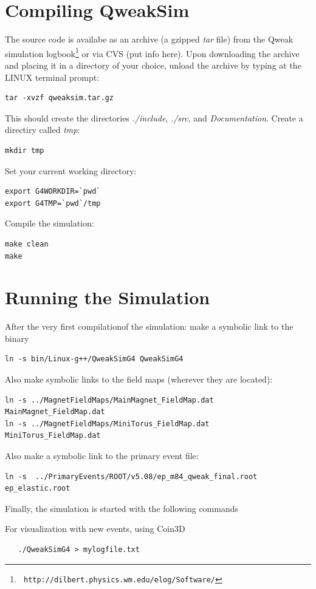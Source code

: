 \section{Compiling QweakSim}

The source code is availabe as an archive (a gzipped {\em tar} file)
from the Qweak simulation logbook\footnote{{\tt
http://dilbert.physics.wm.edu/elog/Software/}} or via CVS (put info
here). Upon downloading the archive and placing it in a directory of
your choice, unload the archive by typing at the LINUX terminal
prompt:
\begin{verbatim}
tar -xvzf qweaksim.tar.gz
\end{verbatim}
This should create the directories {\em ./include}, {\em ./src}, and
{\em Documentation}. Create a directiry called {\em tmp}:
\begin{verbatim}
mkdir tmp
\end{verbatim}
Set your current working directory:
\begin{verbatim}
export G4WORKDIR=`pwd`
export G4TMP=`pwd`/tmp
\end{verbatim}
Compile the simulation:
\begin{verbatim}
make clean
make
\end{verbatim}

\section{Running the Simulation}

After the very first compilationof the simulation: make a symbolic link to the binary
\begin{verbatim}
ln -s bin/Linux-g++/QweakSimG4 QweakSimG4
\end{verbatim}
Also make symbolic links to the field maps (wherever they are located):
\begin{verbatim}
ln -s ../MagnetFieldMaps/MainMagnet_FieldMap.dat MainMagnet_FieldMap.dat
ln -s ../MagnetFieldMaps/MiniTorus_FieldMap.dat  MiniTorus_FieldMap.dat
\end{verbatim}
Also make a symbolic link to the primary event file:
\begin{verbatim}
ln -s  ../PrimaryEvents/ROOT/v5.08/ep_m84_qweak_final.root ep_elastic.root
\end{verbatim}
Finally, the simulation is started with the following commands

For visualization with new events, using Coin3D
\begin{verbatim}
   ./QweakSimG4 > mylogfile.txt                  
\end{verbatim}
    
